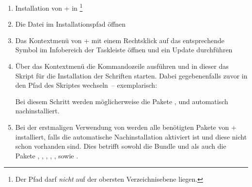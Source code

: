 \begin{enumerate}
\item Installation von \MiKTeX+ in 
  \footnote{%
    Der Pfad darf \emph{nicht} auf der obersten Verzeichnisebene 
     liegen.%
  }
\item Die Datei  im Installationspfad öffnen
\item Das Kontextmenü von \MiKTeX+ mit einem Rechtsklick auf das entsprechende 
  Symbol im Infobereich der Taskleiste öffnen und ein Update durchführen
\item Über das Kontextmenü die Kommandozeile ausführen und in dieser das Skript 
  für die Installation der Schriften  starten.
  Dabei gegebenenfalls zuvor in den Pfad des Skriptes wechseln~-- exemplarisch:
  \begin{quoting}
  \RET*%
  \RET
  \end{quoting}
  Bei diesem Schritt werden möglicherweise die Pakete , 
   und  automatisch nachinstalliert.
\item Bei der erstmaligen Verwendung von \TUDScript werden alle benötigten 
  Pakete von \MiKTeX+ installiert, falls die automatische Nachinstallation 
  aktiviert ist und diese nicht schon vorhanden sind. Dies betrifft sowohl die 
  Bundle  und  als auch die Pakete 
  , , , 
  , ,  sowie 
  .
\end{enumerate}
%
%
